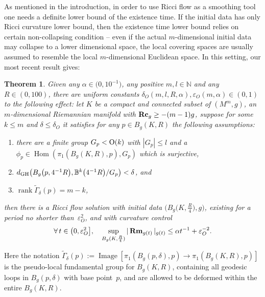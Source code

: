\documentclass[10pt,a4paper]{amsart}
\numberwithin{equation}{section}
\newtheorem{Theorem}{Theorem}[section]
\newcommand{\Rm}{\operatorname{\bf Rm}}
\newcommand{\Rc}{\operatorname{\bf Rc}}
\newcommand{\rank}{\operatorname{rank}}
\begin{document}
As mentioned in the introduction, in order to use Ricci flow as a smoothing
tool one needs a definite lower bound of the existence time. If the initial
data has only Ricci curvature lower bound, then the existence time lower bound
relies on certain non-collapsing condition -- even if the actual
$m$-dimensional initial data may collapse to a lower dimensional space, the
local covering spaces are usually assumed to resemble the local $m$-dimensional
Euclidean space. In this setting, our most recent result \cite[Theorem~1.2]{HW20b} gives:
 \begin{Theorem}\label{thm: HW20b1}
Given any $\alpha\in \big(0,10^{-1}\big)$, any positive $m, l\in \mathbb{N}$ and any
$R\in (0,100)$, there are uniform constants $\delta_{O}(m,l,R,\alpha),
\varepsilon_{O}(m,\alpha)\in (0,1)$ to the following effect: let $K$ be a
compact and connected subset of $(M^m,g)$, an $m$-dimensional Riemannian
manifold with $\Rc_g\ge -(m-1)g$, suppose for some $k\le m$ and $\delta\le
\delta_O$ it satisfies for any $p\in B_g(K,R)$ the following assumptions:
\begin{enumerate}\itemsep=0pt
 \item[$1)$] there are a finite group $G_p<{\rm O}(k)$ with $ |G_p |\le l$ and a
 $\phi_p \in \operatorname{Hom} (\pi_1(B_g(K,R),p),G_p )$ which is
 surjective,
 \item[$2)$] $d_{\rm GH}\big( B_g\big(p,4^{-1}R\big), \mathbb{B}^k\big(4^{-1}R\big)\slash
 G_p\big)<\delta$, and
 \item[$3)$] $\rank \tilde{\Gamma}_{\delta}(p)=m-k$,
 \end{enumerate}
then there is a Ricci flow solution with initial data $\big(B_g\big(K,\frac{R}{4}\big),g\big)$,
existing for a period no shorter than~$\varepsilon_{O}^2$, and with curvature
control
\begin{align*}
\forall\, t\in \big(0,\varepsilon_{O}^2\big],\quad
\sup_{B_g(K,\frac{R}{4})} |\Rm_{g(t)} |_{g(t)} \le \alpha t^{-1} +\varepsilon_{O}^{-2}.
\end{align*}
\end{Theorem}
Here the notation
$\tilde{\Gamma}_{\delta}(p):=\operatorname{Image} [\pi_1(B_g(p,\delta),p)\to
\pi_1(B_g(K,R),p) ]$ is the pseudo-local fundamental
group for $B_g(K,R)$, containing all geodesic loops in $B_g(p,\delta)$ with base
point~$p$, and are allowed to be deformed within the entire $B_g(K,R)$.
\end{document}
